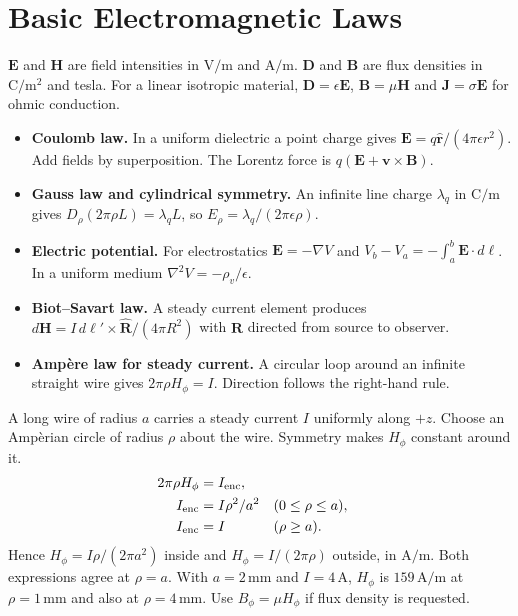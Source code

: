 \documentclass[12pt,a4paper]{article}
\begin{document}
\section{Basic Electromagnetic Laws}
\begin{tcolorbox}[defbox,title={Field quantities}]
$\mathbf E$ and $\mathbf H$ are field intensities in $\mathrm{V/m}$ and $\mathrm{A/m}$. $\mathbf D$ and $\mathbf B$ are flux densities in $\mathrm{C/m^2}$ and tesla. For a linear isotropic material, $\mathbf D=\epsilon\mathbf E$, $\mathbf B=\mu\mathbf H$ and $\mathbf J=\sigma\mathbf E$ for ohmic conduction.
\end{tcolorbox}
\begin{itemize}[leftmargin=*,itemsep=3pt]
\item \textbf{Coulomb law.} In a uniform dielectric a point charge gives $\mathbf E=q\hat{\mathbf r}/(4\pi\epsilon r^2)$. Add fields by superposition. The Lorentz force is $q(\mathbf E+\mathbf v\times\mathbf B)$.
\item \textbf{Gauss law and cylindrical symmetry.} An infinite line charge $\lambda_q$ in $\mathrm{C/m}$ gives $D_\rho(2\pi\rho L)=\lambda_q L$, so $E_\rho=\lambda_q/(2\pi\epsilon\rho)$.
\item \textbf{Electric potential.} For electrostatics $\mathbf E=-\nabla V$ and $V_b-V_a=-\int_a^b\mathbf E\cdot d\boldsymbol\ell$. In a uniform medium $\nabla^2V=-\rho_v/\epsilon$.
\item \textbf{Biot--Savart law.} A steady current element produces $d\mathbf H=I\,d\boldsymbol\ell'\times\hat{\mathbf R}/(4\pi R^2)$ with $\mathbf R$ directed from source to observer.
\item \textbf{Amp\`ere law for steady current.} A circular loop around an infinite straight wire gives $2\pi\rho H_\phi=I$. Direction follows the right-hand rule.
\end{itemize}
\begin{tcolorbox}[examplebox,title={Ampere law inside and outside a solid wire}]
A long wire of radius $a$ carries a steady current $I$ uniformly along $+z$. Choose an Amp\`erian circle of radius $\rho$ about the wire. Symmetry makes $H_\phi$ constant around it.
\[
\begin{aligned}
 2\pi\rho H_\phi&=I_{\rm enc},\\
 I_{\rm enc}&=I\rho^2/a^2 &&(0\le \rho\le a),\\
 I_{\rm enc}&=I &&(\rho\ge a).
\end{aligned}
\]
Hence $H_\phi=I\rho/(2\pi a^2)$ inside and $H_\phi=I/(2\pi\rho)$ outside, in $\mathrm{A/m}$. Both expressions agree at $\rho=a$. With $a=2\,\mathrm{mm}$ and $I=4\,\mathrm A$, $H_\phi$ is $159\,\mathrm{A/m}$ at $\rho=1\,\mathrm{mm}$ and also at $\rho=4\,\mathrm{mm}$. Use $B_\phi=\mu H_\phi$ if flux density is requested.
\end{tcolorbox}
\end{document}
